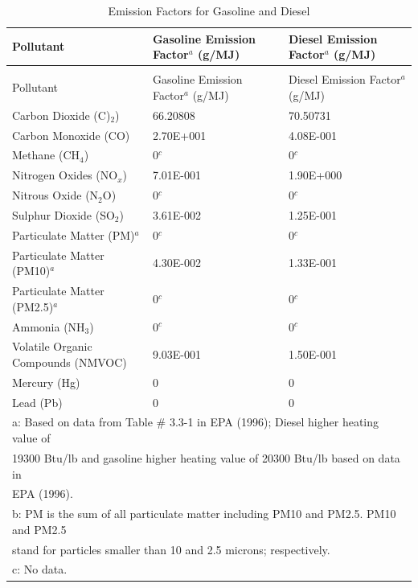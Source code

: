 \begin{longtable}[c]{p{3.0in}p{1.5in}p{1.5in}}
\caption{Emission Factors for Gasoline and Diesel \label{table:emission-factors-for-gasoline-and-diesel}} \tabularnewline
\toprule
Pollutant & Gasoline Emission Factor\(^a\)   (g/MJ) & Diesel Emission Factor\(^a\)   (g/MJ) \tabularnewline
\midrule
\endfirsthead

\caption[]{Emission Factors for Gasoline and Diesel} \tabularnewline
\toprule
Pollutant & Gasoline Emission Factor\(^a\)   (g/MJ) & Diesel Emission Factor\(^a\)   (g/MJ) \tabularnewline
\midrule
\endhead

Carbon Dioxide (C)\(_2\)) & 66.20808 & 70.50731 \tabularnewline
Carbon Monoxide (CO) & 2.70E+001 & 4.08E-001 \tabularnewline
Methane (CH\(_4\)) & 0\(^c\) & 0\(^c\) \tabularnewline
Nitrogen Oxides (NO\(_x\)) & 7.01E-001 & 1.90E+000 \tabularnewline
Nitrous Oxide (N\(_2\)O) & 0\(^c\) & 0\(^c\) \tabularnewline
Sulphur Dioxide (SO\(_2\)) & 3.61E-002 & 1.25E-001 \tabularnewline
Particulate Matter (PM)\(^a\) & 0\(^c\) & 0\(^c\) \tabularnewline
Particulate Matter (PM10)\(^a\) & 4.30E-002 & 1.33E-001 \tabularnewline
Particulate Matter (PM2.5)\(^a\) & 0\(^c\) & 0\(^c\) \tabularnewline
Ammonia (NH\(_3\)) & 0\(^c\) & 0\(^c\) \tabularnewline
Volatile Organic Compounds (NMVOC) & 9.03E-001 & 1.50E-001 \tabularnewline
Mercury (Hg) & 0 & 0 \tabularnewline
Lead (Pb) & 0 & 0 \tabularnewline
\midrule
\multicolumn{3}{l}{a: Based on data from Table \# 3.3-1 in EPA (1996); Diesel higher heating value of} \tabularnewline
\multicolumn{3}{l}{19300 Btu/lb and gasoline higher heating value of 20300 Btu/lb based on data in} \tabularnewline
\multicolumn{3}{l}{EPA (1996).} \tabularnewline
\multicolumn{3}{l}{b: PM is the sum of all particulate matter including PM10 and PM2.5. PM10 and PM2.5} \tabularnewline
\multicolumn{3}{l}{stand for particles smaller than 10 and 2.5 microns; respectively.} \tabularnewline
\multicolumn{3}{l}{c: No data.} \tabularnewline
\bottomrule
\end{longtable}

